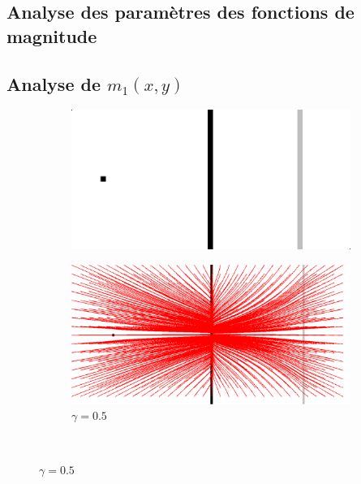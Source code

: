 \begin{appendices}
\section{Analyse des paramètres des fonctions de magnitude}
\subsection{Analyse de $m_1(x,y)$}
\begin{figure}[H]
   \begin{subfigure}[c]{.5\linewidth}
     \centering
     \includegraphics[scale=0.35]{Chapters/Images/synthetic_map.png}
     \caption{}
   \end{subfigure} 
   \begin{subfigure}[c]{.5\linewidth}
     \centering
     \includegraphics[scale=0.35]{Chapters/Images/m1_gamma_5.png}
     \caption{$\gamma=0.5$}
   \end{subfigure} \\
   

\end{figure}
\end{appendices}
